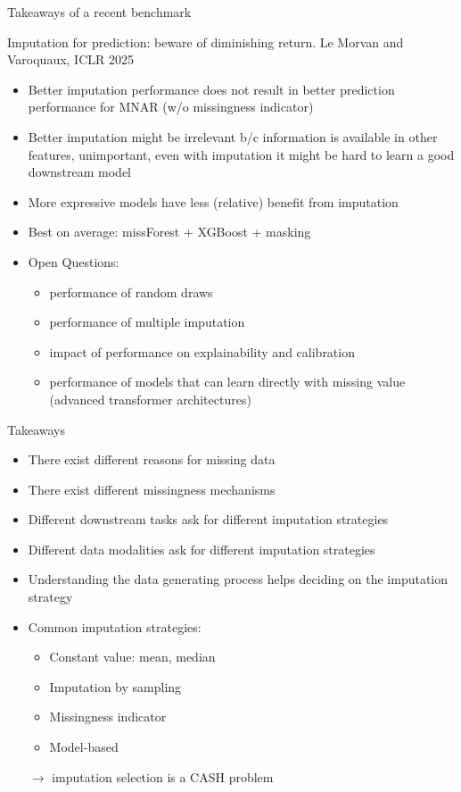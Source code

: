 \documentclass[11pt,compress,t,notes=noshow, xcolor=table]{beamer}
\begin{document}
\begin{frame}{Takeaways of a recent benchmark}

Imputation for prediction: beware of diminishing return. Le Morvan and Varoquaux, ICLR 2025 

\begin{itemize}
    \item Better imputation performance does not result in better prediction performance for MNAR (w/o missingness indicator)
    \item Better imputation might be irrelevant b/c information is available in other features, unimportant, even with imputation it might be hard to learn a good downstream model
    \item More expressive models have less (relative) benefit from imputation
    \item Best on average: missForest + XGBoost + masking
    \item Open Questions:
    \begin{itemize}
        \item performance of random draws
        \item performance of multiple imputation
        \item impact of performance on explainability and calibration
        \item performance of models that can learn directly with missing value (advanced transformer architectures)
    \end{itemize}
\end{itemize}
    
\end{frame}

\begin{frame}{Takeaways}
    \vfill
    \begin{itemize}
        \item There exist different reasons for missing data
        \item There exist different missingness mechanisms
        \item Different downstream tasks ask for different imputation strategies
        \item Different data modalities ask for different imputation strategies
        \item Understanding the data generating process helps deciding on the imputation strategy
        \item Common imputation strategies:
        \begin{itemize}
            \item Constant value: mean, median
            \item Imputation by sampling
            \item Missingness indicator
            \item Model-based
        \end{itemize}
        $\rightarrow$ imputation selection is a CASH problem
    \end{itemize}
    \vfill
\end{frame}

\endlecture
\end{document}
